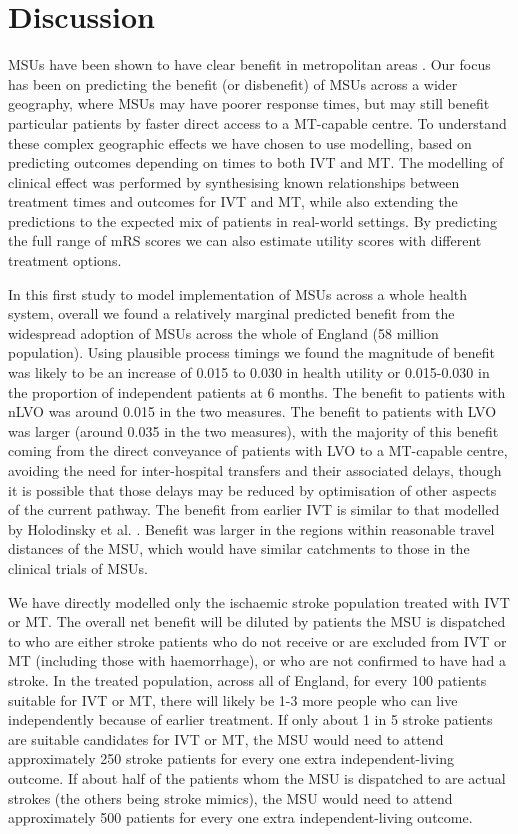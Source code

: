 \section{Discussion}


MSUs have been shown to have clear benefit in metropolitan areas \cite{fatima_mobile_2020, chen_systematic_2022}. Our focus has been on predicting the benefit (or disbenefit) of MSUs across a wider geography, where MSUs may have poorer response times, but may still benefit particular patients by faster direct access to a MT-capable centre. To understand these complex geographic effects we have chosen to use modelling, based on predicting outcomes depending on times to both IVT and MT. The modelling of clinical effect was performed by synthesising known relationships between treatment times and outcomes for IVT and MT, while also extending the predictions to the expected mix of patients in real-world settings. By predicting the full range of mRS scores we can also estimate utility scores with different treatment options.

In this first study to model implementation of MSUs across a whole health system, overall we found a relatively marginal predicted benefit from the widespread adoption of MSUs across the whole of England (58 million population). Using plausible process timings we found the magnitude of benefit was likely to be an increase of 0.015 to 0.030 in health utility or 0.015-0.030 in the proportion of independent patients at 6 months. The benefit to patients with nLVO was around 0.015 in the two measures. The benefit to patients with LVO was larger (around 0.035 in the two measures), with the majority of this benefit coming from the direct conveyance of patients with LVO to a MT-capable centre, avoiding the need for inter-hospital transfers and their associated delays, though it is possible that those delays may be reduced by optimisation of other aspects of the current pathway. The benefit from earlier IVT is similar to that modelled by Holodinsky et al. \cite{holodinsky_jessalyn_k_what_2020}. Benefit was larger in the regions within reasonable travel distances of the MSU, which would have similar catchments to those in the clinical trials of MSUs.

We have directly modelled only the ischaemic stroke population treated with IVT or MT. The overall net benefit will be diluted by patients the MSU is dispatched to who are either stroke patients who do not receive or are excluded from IVT or MT (including those with haemorrhage), or who are not confirmed to have had a stroke. In the treated population, across all of England, for every 100 patients suitable for IVT or MT, there will likely be 1-3 more people who can live independently because of earlier treatment. If only about 1 in 5 stroke patients are suitable candidates for IVT or MT, the MSU would need to attend approximately 250 stroke patients for every one extra independent-living outcome. If about half of the patients whom the MSU is dispatched to are actual strokes (the others being stroke mimics), the MSU would need to attend approximately 500 patients for every one extra independent-living outcome. 

